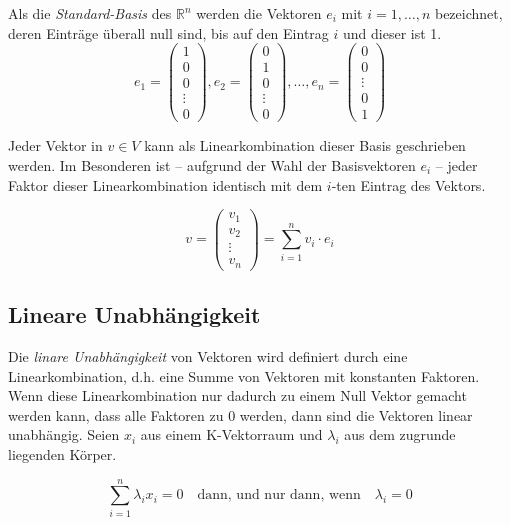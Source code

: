 \begin{definition}
Als die \textsl{Standard-Basis} des $\mathbb{R}^n$ werden die Vektoren $e_i$ mit $i=1,\dots,n$ bezeichnet, deren Einträge überall null sind, bis auf den Eintrag $i$ und dieser ist 1. 
\begin{equation}
e_1 = \begin{pmatrix}
1\\
0\\
0\\
\vdots \\
0
\end{pmatrix}, e_2 = \begin{pmatrix}
0\\
1\\
0\\
\vdots \\
0
\end{pmatrix}, \dots, e_n = \begin{pmatrix}
0\\
0\\
\vdots \\
0\\
1
\end{pmatrix}
\end{equation}
\end{definition}

Jeder Vektor in $v\in V$ kann als Linearkombination dieser Basis geschrieben werden. Im Besonderen ist -- aufgrund der Wahl der Basisvektoren $e_i$ -- jeder Faktor dieser Linearkombination identisch mit dem $i$-ten Eintrag des Vektors. 

\[
v = \begin{pmatrix}
v_1 \\
v_2 \\
\vdots \\
v_n
\end{pmatrix} = \sum_{i=1}^{n} v_i \cdot e_i
\]

\subsection{Lineare Unabhängigkeit}

\begin{definition}
Die \textsl{linare Unabhängigkeit}  von Vektoren wird definiert durch eine Linearkombination, d.h. eine Summe von Vektoren mit konstanten Faktoren. Wenn diese Linearkombination nur dadurch zu einem Null Vektor gemacht werden kann, dass alle Faktoren zu 0 werden, dann sind die Vektoren linear unabhängig. Seien $x_i$ aus einem K-Vektorraum und $\lambda_i $ aus dem zugrunde liegenden Körper. 

\begin{equation}\label{eq:linunabh}
\sum_{i=1}^{n} \lambda_i x_i = 0 \quad \text{dann, und nur dann, wenn} \quad \lambda_i = 0
\end{equation}
\end{definition}

